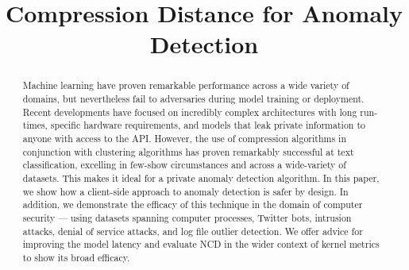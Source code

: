 \documentclass[conference]{IEEEtran}
\begin{document}
\title{Compression Distance for Anomaly Detection}



\maketitle

\begin{abstract}
  Machine learning have proven remarkable performance across a wide variety of domains, but nevertheless fail to adversaries during model training or deployment. 
  Recent developments have focused on incredibly complex architectures with long run-times, specific hardware requirements, and models that leak private information to anyone with access to the API.  
  However, the use of compression algorithms in conjunction with clustering algorithms has proven remarkably successful at text classification, excelling in few-show circumstances and across a wide-variety of datasets. This makes it ideal for a private anomaly detection algorithm. In this paper, we show how a client-side approach to anomaly detection is safer by design.
  In addition, we demonstrate the efficacy of this technique in the domain of computer security --- using datasets spanning computer processes, Twitter bots, intrusion attacks, denial of service attacks, and log file outlier detection.
  We offer advice for improving the model latency and evaluate NCD in the wider context of kernel metrics to show its broad efficacy.
    
\end{abstract}
\end{document}
